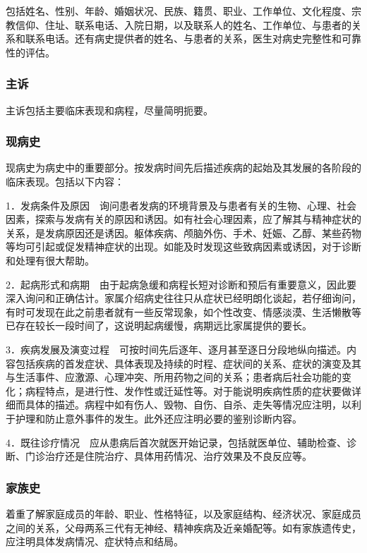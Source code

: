 包括姓名、性别、年龄、婚姻状况、民族、籍贯、职业、工作单位、文化程度、宗教信仰、住址、联系电话、入院日期，以及联系人的姓名、工作单位、与患者的关系和联系电话。还有病史提供者的姓名、与患者的关系，医生对病史完整性和可靠性的评估。

\subsubsection{主诉}

主诉包括主要临床表现和病程，尽量简明扼要。

\subsubsection{现病史}

现病史为病史中的重要部分。按发病时间先后描述疾病的起始及其发展的各阶段的临床表现。包括以下内容：

1．发病条件及原因　询问患者发病的环境背景及与患者有关的生物、心理、社会因素，探索与发病有关的原因和诱因。如有社会心理因素，应了解其与精神症状的关系，是发病原因还是诱因。躯体疾病、颅脑外伤、手术、妊娠、乙醇、某些药物等均可引起或促发精神症状的出现。如能及时发现这些致病因素或诱因，对于诊断和处理有很大帮助。

2．起病形式和病期　由于起病急缓和病程长短对诊断和预后有重要意义，因此要深入询问和正确估计。家属介绍病史往往只从症状已经明朗化谈起，若仔细询问，有时可发现在此之前患者就有一些反常现象，如个性改变、情感淡漠、生活懒散等已存在较长一段时间了，这说明起病缓慢，病期远比家属提供的要长。

3．疾病发展及演变过程　可按时间先后逐年、逐月甚至逐日分段地纵向描述。内容包括疾病的首发症状、具体表现及持续的时程、症状间的关系、症状的演变及其与生活事件、应激源、心理冲突、所用药物之间的关系；患者病后社会功能的变化；病程特点，是进行性、发作性或迁延性等。对于能说明疾病性质的症状要做详细而具体的描述。病程中如有伤人、毁物、自伤、自杀、走失等情况应注明，以利于护理和防止意外事件的发生。此外还应注明必要的鉴别诊断内容。

4．既往诊疗情况　应从患病后首次就医开始记录，包括就医单位、辅助检查、诊断、门诊治疗还是住院治疗、具体用药情况、治疗效果及不良反应等。

\subsubsection{家族史}

着重了解家庭成员的年龄、职业、性格特征，以及家庭结构、经济状况、家庭成员之间的关系，父母两系三代有无神经、精神疾病及近亲婚配等。如有家族遗传史，应注明具体发病情况、症状特点和结局。

